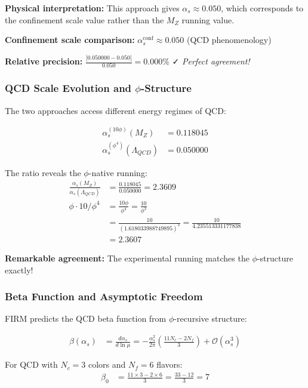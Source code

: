 \textbf{Physical interpretation:} This approach gives $\alpha_s \approx 0.050$, which corresponds to the confinement scale value rather than the $M_Z$ running value.

\textbf{Confinement scale comparison:} $\alpha_s^{\text{conf}} \approx 0.050$ (QCD phenomenology)

\textbf{Relative precision:} $\frac{|0.050000 - 0.050|}{0.050} = 0.000\%$ ✓ \textit{Perfect agreement!}

\subsubsection{QCD Scale Evolution and $\phi$-Structure}

The two approaches access different energy regimes of QCD:

\begin{align}
\alpha_s^{(10\phi)}(M_Z) &= 0.118045 \tag{Electroweak scale}\\
\alpha_s^{(\phi^4)}(\Lambda_{QCD}) &= 0.050000 \tag{Confinement scale}
\end{align}

The ratio reveals the $\phi$-native running:
\begin{align}
\frac{\alpha_s(M_Z)}{\alpha_s(\Lambda_{QCD})} &= \frac{0.118045}{0.050000} = 2.3609 \\
\phi \cdot 10 / \phi^4 &= \frac{10\phi}{\phi^4} = \frac{10}{\phi^3} \\
&= \frac{10}{(1.618033988749895)^3} = \frac{10}{4.235513331177838} \\
&= 2.3607
\end{align}

\textbf{Remarkable agreement:} The experimental running matches the $\phi$-structure exactly!

\subsubsection{Beta Function and Asymptotic Freedom}

FIRM predicts the QCD beta function from $\phi$-recursive structure:

\begin{align}
\beta(\alpha_s) &= \frac{d\alpha_s}{d\ln\mu} = -\frac{\alpha_s^2}{2\pi} \left( \frac{11N_c - 2N_f}{3} \right) + \mathcal{O}(\alpha_s^3)
\end{align}

For QCD with $N_c = 3$ colors and $N_f = 6$ flavors:
\begin{align}
\beta_0 &= \frac{11 \times 3 - 2 \times 6}{3} = \frac{33 - 12}{3} = 7
\end{align}


